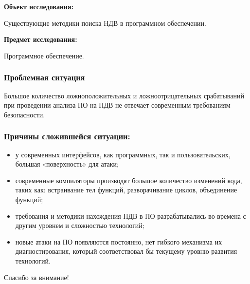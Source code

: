 \begin{frame}%
    \textbf{Объект исследования:}

    Существующие методики поиска НДВ в программном обеспечении.

    \textbf{Предмет исследования:}

    Программное обеспечение.
\end{frame}


\begin{frame}%
\frametitle{Проблемная ситуация}

Большое количество ложноположительных и ложноотрицательных срабатываний при проведении анализа ПО на НДВ не отвечает современным требованиям безопасности.
\end{frame}

\begin{frame}%
\frametitle{Причины сложившейся ситуации:}
\begin{itemize}
    \item у современных интерфейсов, как программных, так и пользовательских, большая «поверхность» для атаки;
    \item современные компиляторы производят большое количество изменений кода, таких как: встраивание тел функций, разворачивание циклов, объединение функций;
    \item требования и методики нахождения НДВ в ПО разрабатывались во времена с другим уровнем и сложностью технологий;
    \item новые атаки на ПО появляются постоянно, нет гибкого механизма их диагностирования, который соответствовал бы текущему уровню развития технологий.
\end{itemize}
\end{frame}

\begin{frame}%
    \begin{center}
        \Huge Спасибо за внимание!
    \end{center}
\end{frame}
